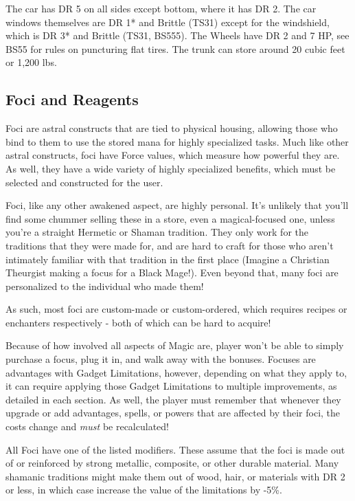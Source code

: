 The car has DR 5 on all sides except bottom, where it has DR 2. The car windows themselves are DR 1* and Brittle (TS31) except for the windshield, which is DR 3* and Brittle (TS31, BS555). The Wheels have DR 2 and 7 HP, see BS55 for rules on puncturing flat tires. The trunk can store around 20 cubic feet or 1,200 lbs.

	
\begin{multicols*}{2}	

	\subsection{Foci and Reagents}
	
	Foci are astral constructs that are tied to physical housing, allowing those who bind to them to use the stored mana for highly specialized tasks. Much like other astral constructs, foci have Force values, which measure how powerful they are. As well, they have a wide variety of highly specialized benefits, which must be selected and constructed for the user.
	
	Foci, like any other awakened aspect, are highly personal. It's unlikely that you'll find some chummer selling these in a store, even a magical-focused one, unless you're a straight Hermetic or Shaman tradition. They only work for the traditions that they were made for, and are hard to craft for those who aren't intimately familiar with that tradition in the first place (Imagine a Christian Theurgist making a focus for a Black Mage!). Even beyond that, many foci are personalized to the individual who made them!
	
	As such, most foci are custom-made or custom-ordered, which requires recipes or enchanters respectively - both of which can be hard to acquire!
	
	Because of how involved all aspects of Magic are, player won't be able to simply purchase a focus, plug it in, and walk away with the bonuses. Focuses are advantages with Gadget Limitations, however, depending on what they apply to, it can require applying those Gadget Limitations to multiple improvements, as detailed in each section. As well, the player must remember that whenever they upgrade or add advantages, spells, or powers that are affected by their foci, the costs change and \textit{must} be recalculated!
	
	All Foci have one of the listed modifiers. These assume that the foci is made out of or reinforced by strong metallic, composite, or other durable material. Many shamanic traditions might make them out of wood, hair, or materials with DR 2 or less, in which case increase the value of the limitations by -5\%.
	

\end{multicols*}
